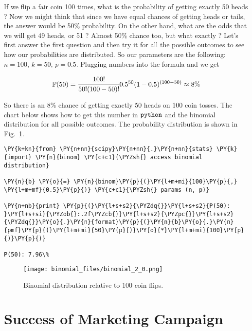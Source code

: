 If we flip a fair coin 100 times, what is the probability of getting
exactly 50 heads ? Now we might think that since we have equal chances
of getting heads or tails, the answer would be 50\% probability. On the
other hand, what are the odds that we will get 49 heads, or 51 ? Almost
50\% chance too, but what exactly ? Let's first answer the first
question and then try it for all the possible outcomes to see how our
probabilities are distributed. So our parameters are the following:
\(n = 100\), \(k = 50\), \(p = 0.5\). Plugging numbers into the formula
and we get

\[\mathbb{P}(50) = \cfrac{100!}{50!(100 - 50)!}0.5^{50}(1-0.5)^{(100-50)} \approx 8\% \]

So there is an 8\% chance of getting exactly 50 heads on 100 coin
tosses. The chart below shows how to get this number in \(\tt{python}\)
and the binomial distribution for all possible outcomes. The probability distribution
is shown in Fig.~\ref{fig:binomial_coin_flip}.

\begin{tcolorbox}[breakable, size=fbox, boxrule=1pt, pad at break*=1mm,colback=cellbackground, colframe=cellborder]
\begin{Verbatim}[commandchars=\\\{\}]
\PY{k+kn}{from} \PY{n+nn}{scipy}\PY{n+nn}{.}\PY{n+nn}{stats} \PY{k}{import} \PY{n}{binom} \PY{c+c1}{\PYZsh{} access binomial distribution}

\PY{n}{b} \PY{o}{=} \PY{n}{binom}\PY{p}{(}\PY{l+m+mi}{100}\PY{p}{,} \PY{l+m+mf}{0.5}\PY{p}{)} \PY{c+c1}{\PYZsh{} params (n, p)}

\PY{n+nb}{print} \PY{p}{(}\PY{l+s+s2}{\PYZdq{}}\PY{l+s+s2}{P(50): }\PY{l+s+si}{\PYZob{}:.2f\PYZcb{}}\PY{l+s+s2}{\PYZpc{}}\PY{l+s+s2}{\PYZdq{}}\PY{o}{.}\PY{n}{format}\PY{p}{(}\PY{n}{b}\PY{o}{.}\PY{n}{pmf}\PY{p}{(}\PY{l+m+mi}{50}\PY{p}{)}\PY{o}{*}\PY{l+m+mi}{100}\PY{p}{)}\PY{p}{)}

P(50): 7.96\%
\end{Verbatim}
\end{tcolorbox}

\begin{figure}[ht]
\centering
    \texttt{[image: binomial\_files/binomial\_2\_0.png]}
    \caption{Binomial distribution relative to 100 coin flips.}
    \label{fig:binomial_coin_flip}
\end{figure}
    
\section{Success of Marketing Campaign}\label{success-of-marketing-campaign}

